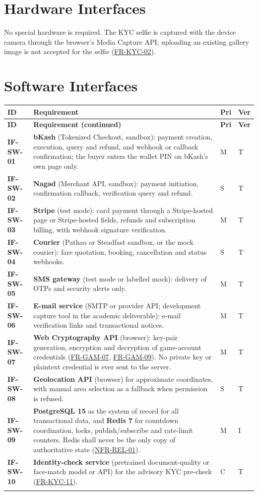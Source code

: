 \documentclass[11pt,a4paper]{report}
\makeatletter
\newenvironment{reqs}{%
  \small
  \begin{longtable}{@{}>{\raggedright\arraybackslash}p{2.35cm}
                       >{\raggedright\arraybackslash}p{10.3cm}
                       >{\centering\arraybackslash}p{0.7cm}
                       >{\centering\arraybackslash}p{0.7cm}@{}}
  \toprule
  \textbf{ID} & \textbf{Requirement} & \textbf{Pri} & \textbf{Ver} \\
  \midrule
  \endfirsthead
  \toprule
  \textbf{ID} & \textbf{Requirement (continued)} & \textbf{Pri} & \textbf{Ver} \\
  \midrule
  \endhead
  \bottomrule
  \endfoot
}{\end{longtable}}
\newcommand{\req}[5]{\leavevmode\textbf{#1}\hypertarget{#1}{} & #5 & #2 & #3 \\ \addlinespace[2pt]}
\newcommand{\rr}[1]{\hyperlink{#1}{#1}}
\makeatother
\begin{document}
\section{Hardware Interfaces}
No special hardware is required. The KYC selfie is captured with the device camera through the browser's Media Capture API; uploading an existing gallery image is not accepted for the selfie (\rr{FR-KYC-02}).

\section{Software Interfaces}
\begin{reqs}
\req{IF-SW-01}{M}{T}{new}{\textbf{bKash} (Tokenized Checkout, sandbox): payment creation, execution, query and refund, and webhook or callback confirmation; the buyer enters the wallet PIN on bKash's own page only.}
\req{IF-SW-02}{S}{T}{new}{\textbf{Nagad} (Merchant API, sandbox): payment initiation, confirmation callback, verification query and refund.}
\req{IF-SW-03}{M}{T}{new}{\textbf{Stripe} (test mode): card payment through a Stripe-hosted page or Stripe-hosted fields, refunds and subscription billing, with webhook signature verification.}
\req{IF-SW-04}{S}{T}{new}{\textbf{Courier} (Pathao or Steadfast sandbox, or the mock courier): fare quotation, booking, cancellation and status webhooks.}
\req{IF-SW-05}{M}{T}{new}{\textbf{SMS gateway} (test mode or labelled mock): delivery of OTPs and security alerts only.}
\req{IF-SW-06}{M}{T}{new}{\textbf{E-mail service} (SMTP or provider API; development capture tool in the academic deliverable): e-mail verification links and transactional notices.}
\req{IF-SW-07}{M}{T}{new}{\textbf{Web Cryptography API} (browser): key-pair generation, encryption and decryption of game-account credentials (\rr{FR-GAM-07}, \rr{FR-GAM-09}). No private key or plaintext credential is ever sent to the server.}
\req{IF-SW-08}{S}{T}{new}{\textbf{Geolocation API} (browser) for approximate coordinates, with manual area selection as a fallback when permission is refused.}
\req{IF-SW-09}{M}{I}{new}{\textbf{PostgreSQL 15} as the system of record for all transactional data, and \textbf{Redis 7} for countdown coordination, locks, publish/subscribe and rate-limit counters. Redis shall never be the only copy of authoritative state (\rr{NFR-REL-01}).}
\req{IF-SW-10}{C}{T}{new}{\textbf{Identity-check service} (pretrained document-quality or face-match model or API) for the advisory KYC pre-check (\rr{FR-KYC-11}).}
\end{reqs}
\end{document}
